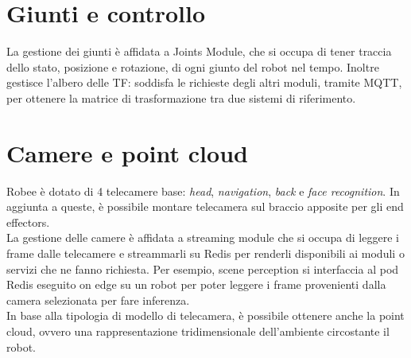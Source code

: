 \section{Giunti e controllo}
La gestione dei giunti è affidata a Joints Module, che si occupa di tener traccia dello stato, posizione e rotazione, di ogni giunto del robot nel tempo. Inoltre
gestisce l'albero delle TF: soddisfa le richieste degli altri moduli, tramite MQTT, per ottenere la matrice di trasformazione tra due sistemi di riferimento.

\section{Camere e point cloud}
Robee è dotato di 4 telecamere base: \textit{head}, \textit{navigation}, \textit{back} e \textit{face recognition}. In aggiunta a queste, è possibile montare telecamera sul braccio apposite per gli end effectors.\\
La gestione delle camere è affidata a streaming module che si occupa di leggere i frame dalle telecamere e streammarli su Redis per renderli disponibili ai moduli o servizi che ne fanno richiesta. Per esempio, scene perception si interfaccia al pod Redis eseguito on edge su un robot per poter leggere i frame provenienti dalla camera selezionata per fare inferenza. \\
In base alla tipologia di modello di telecamera, è possibile ottenere anche la point cloud, ovvero una rappresentazione tridimensionale dell'ambiente circostante il robot.

